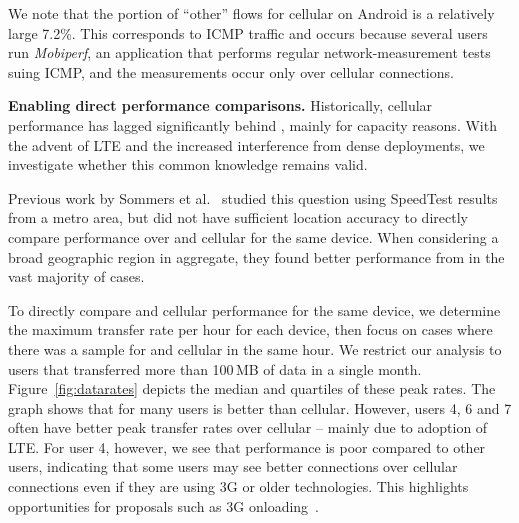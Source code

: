 We note that the portion of ``other'' flows for cellular on Android is a relatively large 7.2\%. This corresponds 
to ICMP traffic and occurs because 
several users run \emph{Mobiperf}, an application that performs regular network-measurement 
tests suing ICMP, and the measurements occur only over cellular connections.


\noindent\textbf{Enabling direct performance comparisons.} 
Historically, cellular performance has lagged significantly behind 
\wifi, mainly for capacity reasons. With the advent of LTE and the 
increased interference from dense \wifi deployments, we investigate whether 
this common knowledge remains valid. 

Previous work by Sommers et al.~\cite{sommers:cellwifi} studied 
this question using SpeedTest results from a metro area, but did not 
have sufficient location accuracy to directly compare performance over 
\wifi and cellular for the same device. When considering a broad geographic 
region in aggregate, they found better performance 
from \wifi in the vast majority of cases. 

To directly compare \wifi and cellular performance for the same device, 
we determine the maximum transfer rate per hour for each device, 
then focus on cases where there was a sample for \wifi and cellular in 
the same hour. We restrict our analysis to users that transferred more than 100\,MB of 
data in a single month. Figure~\ref{fig:datarates} depicts the median 
and quartiles of these peak rates. The graph shows that for many users 
\wifi is better than cellular. However, users 4, 6 and 7 
often have better peak transfer rates over cellular -- mainly due to 
adoption of LTE. For user 4, however, we see that \wifi performance is 
poor compared to other users, indicating that some users may see better 
connections over cellular connections even if they are using 3G or older 
technologies. This highlights opportunities for proposals such as 3G onloading~\cite{vr:3gol}.

